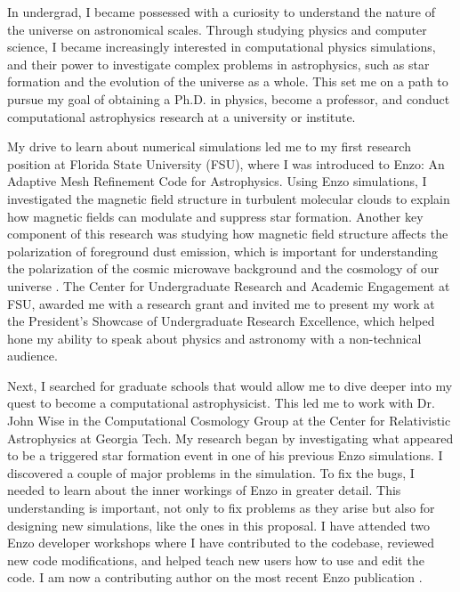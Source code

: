 \documentclass[letterpaper, 12pt]{article}
\begin{document}
In undergrad, I became possessed with a curiosity to understand the nature of the universe on astronomical scales. Through studying physics and computer science, I became increasingly interested in computational physics simulations, and their power to investigate complex problems in astrophysics, such as star formation and the evolution of the universe as a whole. This set me on a path to pursue my goal of obtaining a Ph.D. in physics, become a professor, and conduct computational astrophysics research at a university or institute. 

My drive to learn about numerical simulations led me to my first research position at Florida State University (FSU), where I was introduced to Enzo: An Adaptive Mesh Refinement Code for Astrophysics. Using Enzo simulations, I investigated the magnetic field structure in turbulent molecular clouds to explain how magnetic fields can modulate and suppress star formation. Another key component of this research was studying how magnetic field structure affects the polarization of foreground dust emission, which is important for understanding the polarization of the cosmic microwave background and the cosmology of our universe \citep{Clark2015}. The Center for Undergraduate Research and Academic Engagement at FSU, awarded me with a research grant and invited me to present my work at the President’s Showcase of Undergraduate Research Excellence, which helped hone my ability to speak about physics and astronomy with a non-technical audience.

Next, I searched for graduate schools that would allow me to dive deeper into my quest to become a computational astrophysicist. This led me to work with Dr. John Wise in the Computational Cosmology Group at the Center for Relativistic Astrophysics at Georgia Tech. My research began by investigating what appeared to be a triggered star formation event in one of his previous Enzo simulations. I discovered a couple of major problems in the simulation. To fix the bugs, I needed to learn about the inner workings of Enzo in greater detail. This understanding is important, not only to fix problems as they arise but also for designing new simulations, like the ones in this proposal. I have attended two Enzo developer workshops where I have contributed to the codebase, reviewed new code modifications, and helped teach new users how to use and edit the code. I am now a contributing author on the most recent Enzo publication \citep{ENZO2019_JOSS}.
\end{document}
